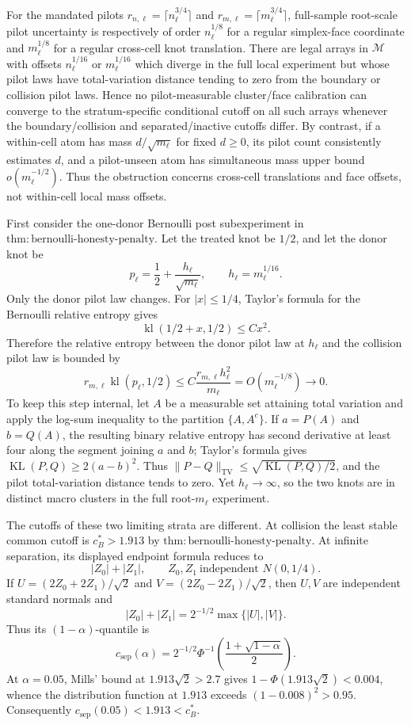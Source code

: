 For the mandated pilots \(r_{n,\ell}=\lceil n_\ell^{3/4}\rceil\) and \(r_{m,\ell}=\lceil m_\ell^{3/4}\rceil\), full-sample root-scale pilot uncertainty is respectively of order \(n_\ell^{1/8}\) for a regular simplex-face coordinate and \(m_\ell^{1/8}\) for a regular cross-cell knot translation.  There are legal arrays in \(\mathcal M\) with offsets \(n_\ell^{1/16}\) or \(m_\ell^{1/16}\) which diverge in the full local experiment but whose pilot laws have total-variation distance tending to zero from the boundary or collision pilot laws.  Hence no pilot-measurable cluster/face calibration can converge to the stratum-specific conditional cutoff on all such arrays whenever the boundary/collision and separated/inactive cutoffs differ.  By contrast, if a within-cell atom has mass \(d/\sqrt{m_\ell}\) for fixed \(d\geq0\), its pilot count consistently estimates \(d\), and a pilot-unseen atom has simultaneous mass upper bound \(o(m_\ell^{-1/2})\).  Thus the obstruction concerns cross-cell translations and face offsets, not within-cell local mass offsets.

First consider the one-donor Bernoulli post subexperiment in \(\mathrm{thm:bernoulli\mbox{-}honesty\mbox{-}penalty}\).  Let the treated knot be \(1/2\), and let the donor knot be
\[
 p_\ell=\frac12+\frac{h_\ell}{\sqrt{m_\ell}},
 \qquad h_\ell=m_\ell^{1/16}.
\]
Only the donor pilot law changes.  For \(|x|\leq1/4\), Taylor's formula for the Bernoulli relative entropy gives
\[
 \operatorname{kl}(1/2+x,1/2)\leq Cx^2.
\]
Therefore the relative entropy between the donor pilot law at \(h_\ell\) and the collision pilot law is bounded by
\[
 r_{m,\ell}\operatorname{kl}(p_\ell,1/2)
 \leq C\frac{r_{m,\ell}h_\ell^2}{m_\ell}
 =O(m_\ell^{-1/8})\longrightarrow0.
\]
To keep this step internal, let \(A\) be a measurable set attaining total variation and apply the log-sum inequality to the partition \(\{A,A^c\}\).  If \(a=P(A)\) and \(b=Q(A)\), the resulting binary relative entropy has second derivative at least four along the segment joining \(a\) and \(b\); Taylor's formula gives \(\operatorname{KL}(P,Q)\geq2(a-b)^2\).  Thus \(\|P-Q\|_{\mathrm{TV}}\leq\sqrt{\operatorname{KL}(P,Q)/2}\), and the pilot total-variation distance tends to zero.  Yet \(h_\ell\to\infty\), so the two knots are in distinct macro clusters in the full root-\(m_\ell\) experiment.

The cutoffs of these two limiting strata are different.  At collision the least stable common cutoff is \(c_B^*>1.913\) by \(\mathrm{thm:bernoulli\mbox{-}honesty\mbox{-}penalty}\).  At infinite separation, its displayed endpoint formula reduces to
\[
 |Z_0|+|Z_1|,
 \qquad Z_0,Z_1\ \text{independent }N(0,1/4).
\]
If \(U=(2Z_0+2Z_1)/\sqrt2\) and
\(V=(2Z_0-2Z_1)/\sqrt2\), then \(U,V\) are independent standard normals and
\[
 |Z_0|+|Z_1|=2^{-1/2}\max\{|U|,|V|\}.
\]
Thus its \((1-\alpha)\)-quantile is
\[
 c_{\mathrm{sep}}(\alpha)=
 2^{-1/2}\Phi^{-1}\left(\frac{1+\sqrt{1-\alpha}}2\right).
\]
At \(\alpha=0.05\), Mills' bound at \(1.913\sqrt2>2.7\) gives
\(1-\Phi(1.913\sqrt2)<0.004\), whence the distribution function at \(1.913\) exceeds \((1-0.008)^2>0.95\).  Consequently
\(c_{\mathrm{sep}}(0.05)<1.913<c_B^*\).

